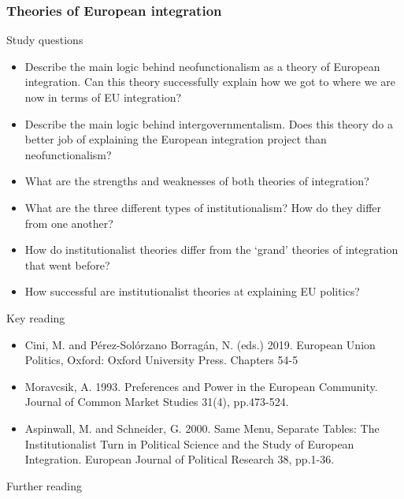 
\subsubsection*{Theories of European integration}

Study questions

\begin{itemize}
	\item Describe the main logic behind neofunctionalism as a theory of European integration. Can this theory successfully explain how we got to where we are now in terms of EU integration?
	\item Describe the main logic behind intergovernmentalism. Does this theory do a better job of explaining the European integration project than neofunctionalism?
	\item What are the strengths and weaknesses of both theories of integration?
	\item What are the three different types of institutionalism? How do they differ from one another?
	\item How do institutionalist theories differ from the `grand' theories of integration that went before?
	\item How successful are institutionalist theories at explaining EU politics?
\end{itemize}

\noindent Key reading

\begin{itemize}
	\item Cini, M. and Pérez-Solórzano Borragán, N. (eds.) 2019. European Union Politics, Oxford: Oxford University Press. Chapters 54-5
	\item Moravcsik, A. 1993. Preferences and Power in the European Community. Journal of Common Market Studies 31(4), pp.473-524.
	\item Aspinwall, M. and Schneider, G. 2000. Same Menu, Separate Tables: The Institutionalist Turn in Political Science and the Study of European Integration. European Journal of Political Research 38, pp.1-36.
\end{itemize}


\noindent Further reading

